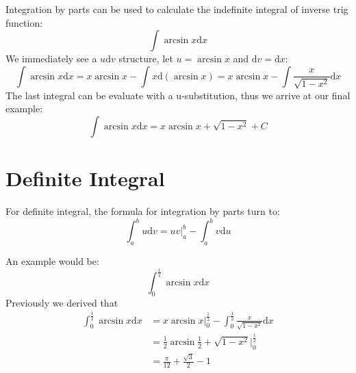 \documentclass{article}
\numberwithin{equation}{section}
\begin{document}
Integration by parts can be used to calculate the indefinite integral of inverse trig function:
\[
\int \arcsin x \mathrm{d}x
\]
We immediately see a $u\mathrm{d}v$ structure, let $u=\arcsin x$ and $\mathrm{d}v = \mathrm{d}x$:
\[
\int \arcsin x \mathrm{d}x = x\arcsin x - \int x \mathrm{d}(\arcsin x) = x\arcsin x - \int \frac{x}{\sqrt{1-x^2}} \mathrm{d}x
\]
The last integral can be evaluate with a u-substitution, thus we arrive at our final example:
\[
\int \arcsin x \mathrm{d}x = x\arcsin x + \sqrt{1-x^2} + C
\]

\newpage
\section{Definite Integral}
For definite integral, the formula for integration by parts turn to:
\[
\int_{a}^{b} u\mathrm{d}v = uv \Big|_a^b - \int_{a}^{b} v\mathrm{d}u
\]

An example would be:
\[
\int_{0}^{\frac{1}{2}} \arcsin x \mathrm{d}x
\]
Previously we derived that
\begin{align*}
    \int_{0}^{\frac{1}{2}} \arcsin x \mathrm{d}x &= x\arcsin x \Big|_0^{\frac{1}{2}}- \int_{0}^{\frac{1}{2}} \frac{x}{\sqrt{1-x^2}} \mathrm{d}x\\
    &= \frac{1}{2} \arcsin \frac{1}{2} + \sqrt{1-x^2} \Big|_{0}^{\frac{1}{2}}\\
    &= \frac{\pi}{12} + \frac{\sqrt{3}}{2} - 1
\end{align*}
\end{document}
